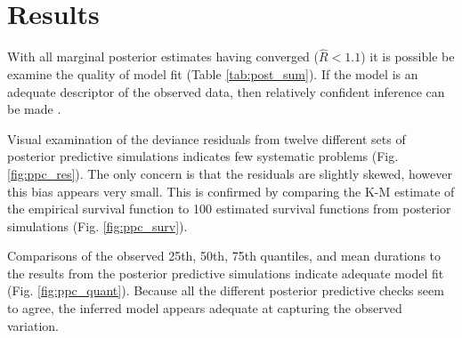\documentclass[12pt,letterpaper]{article}
\begin{document}
\section{Results}

With all marginal posterior estimates having converged (\(\hat{R} < 1.1\)) it is possible be examine the quality of model fit (Table \ref{tab:post_sum}). If the model is an adequate descriptor of the observed data, then relatively confident inference can be made \citep{Gelman2013d}.

Visual examination of the deviance residuals from twelve different sets of posterior predictive simulations indicates few systematic problems (Fig. \ref{fig:ppc_res}). The only concern is that the residuals are slightly skewed, however this bias appears very small. This is confirmed by comparing the K-M estimate of the empirical survival function to 100 estimated survival functions from posterior simulations (Fig. \ref{fig:ppc_surv}).

Comparisons of the observed 25th, 50th, 75th quantiles, and mean durations to the results from the posterior predictive simulations indicate adequate model fit (Fig. \ref{fig:ppc_quant}). Because all the different posterior predictive checks seem to agree, the inferred model appears adequate at capturing the observed variation.

\end{document}
